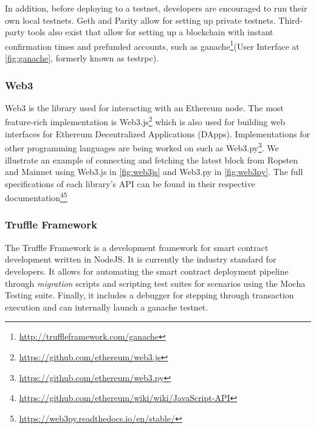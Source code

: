 In addition, before deploying to a testnet, developers are encouraged to run their own local testnets. Geth and Parity allow for setting up private testnets. Third-party tools also exist that allow for setting up a blockchain with instant confirmation times and prefunded accounts, such as ganache\footnote{\url{http://truffleframework.com/ganache}}(User Interface at \ref{fig:ganache},  formerly known as testrpc).


\subsubsection{Web3}
Web3 is the library used for interacting with an Ethereum node. The most feature-rich implementation is Web3.js\footnote{\url{https://github.com/ethereum/web3.js}} which is also used for building web interfaces for Ethereum Decentralized Applications (DApps). Implementations for other programming languages are being worked on such as Web3.py\footnote{\url{https://github.com/ethereum/web3.py}}. We illustrate an example of connecting and fetching the latest block from Ropsten and Mainnet using Web3.js in \ref{fig:web3js} and Web3.py in \ref{fig:web3py}. The full specifications of each library's API can be found in their respective documentation\footnote{\url{https://github.com/ethereum/wiki/wiki/JavaScript-API}}\footnote{\url{https://web3py.readthedocs.io/en/stable/}}


\subsubsection{Truffle Framework}
The Truffle Framework is a development framework for smart contract development written in NodeJS. It is currently the industry standard for developers. It allows for automating the smart contract deployment pipeline through \textit{migration} scripts and scripting test suites for scenarios using the Mocha Testing suite. Finally, it includes a debugger for stepping through transaction execution and can internally launch a ganache testnet.